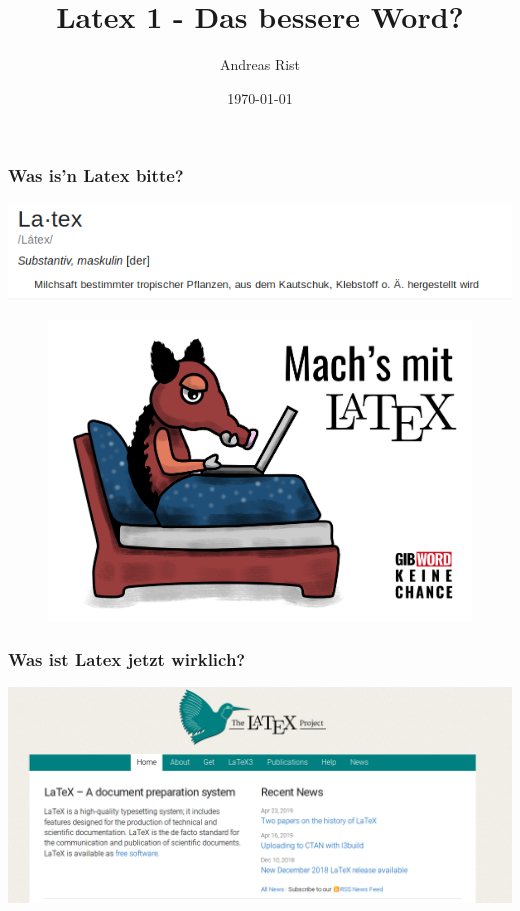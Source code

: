 \documentclass{beamer}
\title[Latex1]{Latex 1 -  Das bessere Word?} %
\author{Andreas Rist} %
\institute[FSI] %
{
Uni Tübingen\\ %
\medskip
\textit{fsi@fsi.uni-tuebingen.de} %
}
\date{\today} %
\begin{document}
\begin{frame}
\titlepage %
\end{frame}



\begin{frame}
\frametitle{Was is'n Latex bitte?}
\includegraphics[width=\linewidth]{pictures/latex_tree.png}
\begin{figure}
\centering

\includegraphics[width=0.7\linewidth]{pictures/latex_sexy.png}
\end{figure}
\end{frame}


\begin{frame}
\frametitle{Was ist Latex jetzt wirklich?}
\includegraphics[width=\linewidth]{pictures/reallatex.png}

\end{frame}
\end{document}
